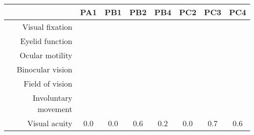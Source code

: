 \footnotesize
\let\oldarraystretch\arraystretch
\renewcommand{\arraystretch}{2}
\newcommand{\skill}{\cellcolor{lightgray}}
\newcommand{\noskill}{\cellcolor{accent1}\textcolor{muteblack}{\BigCross}}
\newcommand{\snoskill}{\cellcolor{accent2}\textcolor{muteblack}{\BigDiamondshape}}
\begin{tabular}{r|ccccccc}
                          & PA1      & PB1      & PB2       & PB4      & PC2       & PC3       & PC4 \\ \hline
  Visual fixation         & \noskill & \noskill & \noskill  & \noskill & \noskill  & \noskill  & \noskill \\
  Eyelid function         & \skill   & \skill   & \skill    & \skill   & \noskill  & \noskill  & \skill \\
  Ocular motility         & \skill   & \noskill & \skill    & \noskill & \snoskill & \snoskill & \noskill\\
  Binocular vision        & \skill   & \skill   & \skill    & \skill   & \noskill  & \snoskill & \snoskill \\
  Field of vision         & \skill   & \skill   & \skill    & \skill   & \skill    & \noskill  & \noskill \\
  Involuntary movement    & \skill   & \noskill & \noskill  & \noskill & \noskill  & \noskill  & \skill \\ \hline
  Visual acuity   & 0.0      & 0.0      & 0.6       & 0.2      & 0.0       & 0.7  & 0.6\\
\end{tabular}
